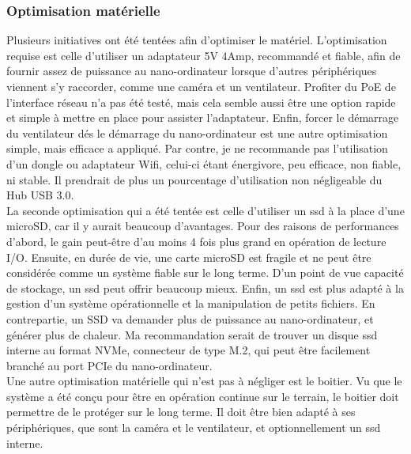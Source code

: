 \subsubsection{Optimisation matérielle}
\noindent Plusieurs initiatives ont été tentées afin d'optimiser le matériel. L'optimisation requise est celle d'utiliser un adaptateur 5V 4Amp, recommandé et fiable, afin de fournir assez de puissance au nano-ordinateur lorsque d'autres périphériques viennent s'y raccorder, comme une caméra et un ventilateur. Profiter du PoE de l'interface réseau n'a pas été testé, mais cela semble aussi être une option rapide et simple à mettre en place pour assister l'adaptateur. Enfin, forcer le démarrage du ventilateur dés le démarrage du nano-ordinateur est une autre optimisation simple, mais efficace a appliqué. Par contre, je ne recommande pas l'utilisation d'un dongle ou adaptateur Wifi, celui-ci étant énergivore, peu efficace, non fiable, ni stable. Il prendrait de plus un pourcentage d'utilisation non négligeable du Hub USB 3.0. 
\vspace{\baselineskip}
\\
\noindent La seconde optimisation qui a été tentée est celle d'utiliser un \acrshort{ssd} à la place d'une microSD, car il y aurait beaucoup d'avantages. Pour des raisons de performances d'abord, le gain peut-être d'au moins 4 fois plus grand en opération de lecture I/O. Ensuite, en durée de vie, une carte microSD est fragile et ne peut être considérée comme un système fiable sur le long terme. D'un point de vue capacité de stockage, un \acrshort{ssd} peut offrir beaucoup mieux. Enfin, un \acrshort{ssd} est plus adapté à la gestion d'un système opérationnelle et la manipulation de petits fichiers. En contrepartie, un SSD va demander plus de puissance au nano-ordinateur, et générer plus de chaleur. Ma recommandation serait de trouver un disque \acrshort{ssd} interne au format NVMe, connecteur de type M.2, qui peut être facilement branché au port PCIe du nano-ordinateur.
\vspace{\baselineskip}
\\
\noindent Une autre optimisation matérielle qui n'est pas à négliger est le boitier. Vu que le système a été conçu pour être en opération continue sur le terrain, le boitier doit permettre de le protéger sur le long terme. Il doit être bien adapté à ses périphériques, que sont la caméra et le ventilateur, et optionnellement un \acrshort{ssd} interne.

